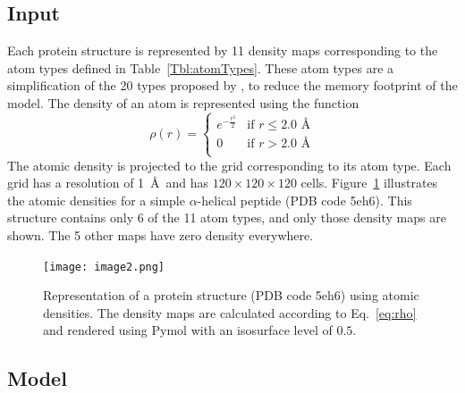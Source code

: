 \documentclass{bioinfo}
\begin{document}
\subsection{Input}

Each protein structure is represented by 11 density maps corresponding
to the atom types defined in Table~\ref{Tbl:atomTypes}. These atom
types are a simplification of the 20 types proposed by \citet{huang2006iterative, huang2008iterative}, to reduce the
memory footprint of the model.
The density of an atom is represented using the function
\begin{equation}
\rho(r) =  \begin{cases}
               e^{-\frac{r^2}{2}}&\text{if } r\leq 2.0\text{ \AA} \\
               0                 &\text{if } r>2.0\text{ \AA} \\
            \end{cases}
\label{eq:rho}
\end{equation}
The atomic density is projected to the grid corresponding to its atom
type. Each grid has a resolution of 1~\AA\ and has $120\times
120\times 120$ cells.
%
Figure~\ref{Fig:atomic_densities} illustrates the atomic densities for
a simple $\alpha$-helical peptide (PDB code 5eh6). This structure
contains only 6 of the 11 atom types, and only those density maps are
shown. The 5 other maps have zero density everywhere.

\begin{figure}[t]
    \centerline{\texttt{[image: image2.png]}}
%
    \vspace{-10pt}
    \caption{Representation of a protein structure (PDB code 5eh6)
    using atomic densities. The density maps are calculated according
    to Eq.~\ref{eq:rho} and rendered using Pymol \citep{PyMOL} with an
    isosurface level of $0.5$.}
%
    \label{Fig:atomic_densities}
\end{figure}


\subsection{Model}
\end{document}

